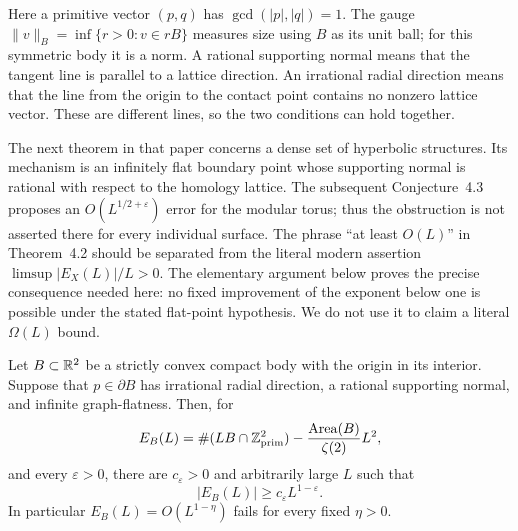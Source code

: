 Here a primitive vector $(p,q)$ has $\gcd(|p|,|q|)=1$.
The gauge $\|v\|_B=\inf\{r>0:v\in rB\}$ measures size
using $B$ as its unit ball; for this symmetric body it is a norm.
A rational supporting normal means that the tangent line is parallel
to a lattice direction. An irrational radial direction means that
the line from the origin to the contact point contains no nonzero
lattice vector. These are different lines, so the two conditions
can hold together.

The next theorem in that paper concerns a dense set of hyperbolic
structures. Its mechanism is an infinitely flat boundary point whose
supporting normal is rational with respect to the homology lattice.
The subsequent Conjecture~4.3 proposes an $O(L^{1/2+\varepsilon})$ error
for the modular torus; thus the obstruction is not asserted there for
every individual surface. The phrase ``at least $O(L)$'' in Theorem~4.2
should be separated from the literal modern assertion
$\limsup|E_X(L)|/L>0$. The elementary argument below proves the precise
consequence needed here: no fixed improvement of the exponent below one
is possible under the stated flat-point hypothesis. We do not use it to
claim a literal $\Omega(L)$ bound.

\begin{proposition}
\label{prop:normballflatrow}
Let $B\subset\mathbb R^2$ be a strictly convex compact body with the origin
in its interior. Suppose that $p\in\partial B$ has irrational radial
direction, a rational supporting normal, and infinite graph-flatness.
Then, for
\[
 E_B(L)=\#(LB\cap\mathbb Z^2_{\mathrm{prim}})
       -\frac{\operatorname{Area}(B)}{\zeta(2)}L^2,
\]
and every $\varepsilon>0$, there are $c_\varepsilon>0$ and arbitrarily
large $L$ such that
\begin{equation}
 |E_B(L)|\geq c_\varepsilon L^{1-\varepsilon}.
 \label{eq:normballlowerpower}
\end{equation}
In particular $E_B(L)=O(L^{1-\eta})$ fails for every fixed $\eta>0$.
\end{proposition}

